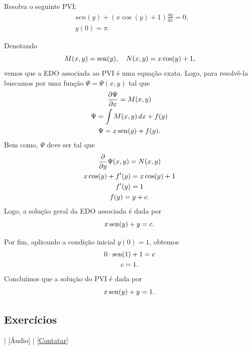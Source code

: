 \begin{exeresol}
  Resolva o seguinte PVI:
  \begin{align}
    &sen(y) + (x\cos(y)+1)\frac{dy}{dx} = 0,\\
    &y(0)=\pi.
  \end{align}
\end{exeresol}
\begin{resol}
  Denotando
  \begin{equation}
    M(x,y) = \operatorname{sen}(y),\quad N(x,y) = x\cos(y)+1,
  \end{equation}
  vemos que a EDO associada ao PVI é uma equação exata. Logo, para resolvê-la buscamos por uma função $\Psi = \Psi(x,y)$ tal que
  \begin{gather}
    \frac{\partial \Psi}{\partial x} = M(x,y) \\
    \Psi = \int M(x,y)\,dx + f(y) \\
    \Psi = x\operatorname{sen}(y) + f(y).
  \end{gather}
  Bem como, $\Psi$ deve ser tal que
  \begin{gather}
    \frac{\partial}{\partial y}\Psi(x,y) = N(x,y) \\
    x\cos(y) + f'(y) = x\cos(y)+1 \\
    f'(y) = 1 \\
    f(y) = y + c.
  \end{gather}
  Logo, a solução geral da EDO associada é dada por
  \begin{equation}
    x\operatorname{sen}(y) + y = c.
  \end{equation}

  Por fim, aplicando a condição inicial $y(0) = 1$, obtemos
  \begin{gather}
    0\cdot\operatorname{sen}(1)+1 = c \\
    c = 1.
  \end{gather}
  Concluímos que a solução do PVI é dada por
  \begin{equation}
    x\operatorname{sen}(y) + y = 1.
  \end{equation}
\end{resol}

\subsection*{Exercícios}

\begin{flushright}
  [Vídeo] | [Áudio] | \href{https://phkonzen.github.io/notas/contato.html}{[Contatar]}
\end{flushright}

